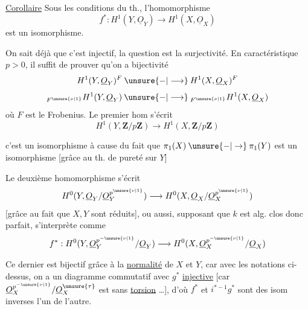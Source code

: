 \uline{Corollaire} Sous les conditions du th., l'homomorphisme
\[
f^*:H^1(Y,\underline O_Y)\longrightarrow H^1(X,\underline O_X)
\]
est un isomorphisme.

On sait déjà que c'est injectif, la question est la surjectivité.
En caractéristique $p>0$, il suffit de prouver qu'on a bijectivité
\[
H^1(Y,\underline O_Y)^F
\mathbin{\unsure{-|\longrightarrow}}
H^1(X,\underline O_X)^F
\]
\[
{}_{F^{\unsure{\nu|1}}}H^1(Y,\underline O_Y)
\mathbin{\unsure{-|\longrightarrow}}
{}_{F^{\unsure{\nu|1}}}H^1(X,\underline O_X)
\]
où $F$ est le Frobenius.
Le premier hom s'écrit
\[
H^1(Y,\mathbf Z/p\mathbf Z)\longrightarrow H^1(X,\mathbf Z/p\mathbf Z)
\]

c'est un isomorphisme à cause du fait que
$\pi_1(X)\mathbin{\unsure{-|\to}}\pi_1(Y)$ est un isomorphisme
[grâce au th. de pureté sur $Y$]

Le deuxième homomorphisme s'écrit
\[
H^0(Y,\underline O_Y/\underline O_Y^{p^{\unsure{\nu|1}}})
\longrightarrow
H^0(X,\underline O_X/\underline O_X^{p^{\unsure{\nu|1}}})
\]
[grâce au fait que $X,Y$ sont réduits],
ou aussi, supposant que $k$ est alg. clos donc parfait,
s'interprète comme
\[
f^*:H^0(Y,\underline O_Y^{p^{-\unsure{\nu|1}}}/\underline O_Y)
\longrightarrow
H^0(X,\underline O_X^{p^{-\unsure{\nu|1}}}/\underline O_X)
\]

Ce dernier est bijectif grâce à la \uline{normalité} de $X$ et $Y$,
car  avec les notations ci-dessus, on a un
diagramme commutatif
avec $g^*$ \uline{injective}
[car $\underline O_X^{p^{-\unsure{\nu|1}}}/
\underline O_X^{\unsure{\tau}}$ est 
sans \uline{torsion} \ldots],
d'où $f^*$ et $i^{*-1}g^*$ sont des isom inverses l'un de l'autre.

